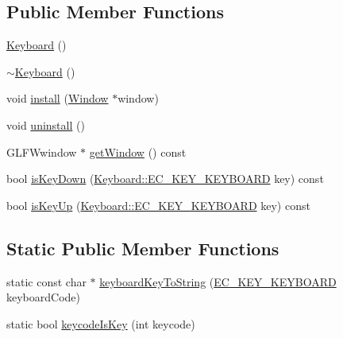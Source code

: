 \subsection*{Public Member Functions}
\begin{DoxyCompactItemize}
\item 
\mbox{\hyperlink{classec_1_1_keyboard_aca1d01cce4b8449083c32e2a167a3448}{Keyboard}} ()
\item 
\mbox{\hyperlink{classec_1_1_keyboard_a817f6cd6ea29898c6651dee24de59ba5}{$\sim$\+Keyboard}} ()
\item 
void \mbox{\hyperlink{classec_1_1_keyboard_af792a3b8226096510f6dfecc57697f8e}{install}} (\mbox{\hyperlink{classec_1_1_window}{Window}} $\ast$window)
\item 
void \mbox{\hyperlink{classec_1_1_keyboard_a1e60401ed958ec3d94a77b1dda9f44e8}{uninstall}} ()
\item 
G\+L\+F\+Wwindow $\ast$ \mbox{\hyperlink{classec_1_1_keyboard_ad6b17bd2f2853def1e6ec21fadd9b658}{get\+Window}} () const
\item 
bool \mbox{\hyperlink{classec_1_1_keyboard_a47779c0842584eb4337e1aa63e7d7a35}{is\+Key\+Down}} (\mbox{\hyperlink{classec_1_1_keyboard_a135ca08df15aebf8c93ce3cc76288a6e}{Keyboard\+::\+E\+C\+\_\+\+K\+E\+Y\+\_\+\+K\+E\+Y\+B\+O\+A\+RD}} key) const
\item 
bool \mbox{\hyperlink{classec_1_1_keyboard_a0d260eb1df363be405af8a967aa8b5b6}{is\+Key\+Up}} (\mbox{\hyperlink{classec_1_1_keyboard_a135ca08df15aebf8c93ce3cc76288a6e}{Keyboard\+::\+E\+C\+\_\+\+K\+E\+Y\+\_\+\+K\+E\+Y\+B\+O\+A\+RD}} key) const
\end{DoxyCompactItemize}
\subsection*{Static Public Member Functions}
\begin{DoxyCompactItemize}
\item 
static const char $\ast$ \mbox{\hyperlink{classec_1_1_keyboard_a5e986024ce4790af20b3198abce9b807}{keyboard\+Key\+To\+String}} (\mbox{\hyperlink{classec_1_1_keyboard_a135ca08df15aebf8c93ce3cc76288a6e}{E\+C\+\_\+\+K\+E\+Y\+\_\+\+K\+E\+Y\+B\+O\+A\+RD}} keyboard\+Code)
\item 
static bool \mbox{\hyperlink{classec_1_1_keyboard_a8d048694060edbbb3cd6dba19d7eff24}{keycode\+Is\+Key}} (int keycode)
\end{DoxyCompactItemize}
